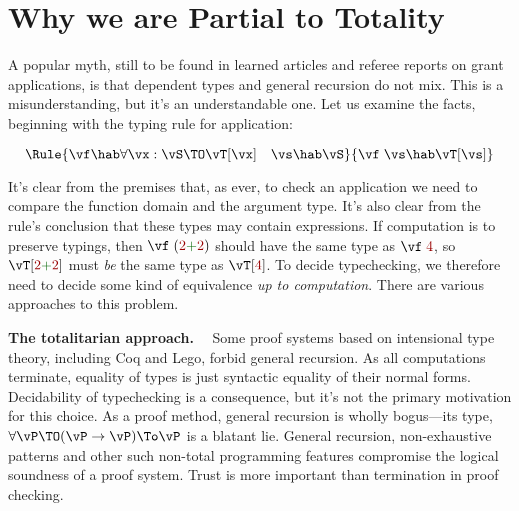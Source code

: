\documentclass{fundam}
\begin{document}



\section{Why we are Partial to Totality}
\label{sec:partial}

A popular myth, still to be found in learned articles and referee reports on
grant applications, is that dependent types and general recursion do not
mix. This is a misunderstanding, but it's an understandable one.
Let us examine the facts, beginning with the typing rule for application:

\[
\Rule{\vf\hab\forall\vx:\vS\TO\vT[\vx]\quad\vs\hab\vS}
     {\vf\;\vs\hab\vT[\vs]}
\]

It's clear from the premises that, as ever, to check an application we
need to compare the function domain and the argument type. It's also
clear from the rule's conclusion that these types may contain
expressions. If computation is to preserve typings, then
$\vf\;(\red{2}\green{+}\red{2})$ should have the same type as
$\vf\;\red{4}$, so $\vT[\red{2}\green{+}\red{2}]$ must \emph{be} the
same type as $\vT[\red{4}]$. To decide typechecking, we therefore need
to decide some kind of equivalence \emph{up to computation}. There are
various approaches to this problem.


\textbf{The totalitarian approach.}$\quad$
%
Some proof systems based on intensional type theory, including Coq and
Lego, forbid general recursion. As all computations terminate,
equality of types is just syntactic equality of their normal forms.
Decidability of typechecking is a consequence, but it's not the
primary motivation for this choice. As a proof method, general
recursion is wholly bogus---its type, $\forall\vP\TO(\vP\to\vP)\To\vP$
is a blatant lie. General recursion, non-exhaustive
patterns and other such non-total programming features compromise the
logical soundness of a proof system.
Trust is more important than termination in proof checking.
\end{document}
